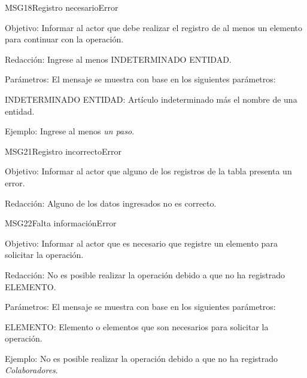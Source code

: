 \begin{mensaje}{MSG18}{Registro necesario}{Error}
    \item[Objetivo:] Informar al actor que debe realizar el registro de al menos un elemento para continuar con la operación.
    \item[Redacción:] Ingrese al menos INDETERMINADO ENTIDAD.
    \item[Parámetros:] El mensaje se muestra con base en los siguientes parámetros:
    \begin{Citemize}
	\item INDETERMINADO ENTIDAD: Artículo indeterminado más el nombre de una entidad.
    \end{Citemize}
    \item[Ejemplo:] Ingrese al menos {\em un paso}.
\end{mensaje}
\begin{mensaje}{MSG21}{Registro incorrecto}{Error}
    \item[Objetivo:] Informar al actor que alguno de los registros de la tabla presenta un error.
    \item[Redacción:] Alguno de los datos ingresados no es correcto.
\end{mensaje}
\begin{mensaje}{MSG22}{Falta información}{Error}
    \item[Objetivo:] Informar al actor que es necesario que registre un elemento para solicitar la operación.
    \item[Redacción:] No es posible realizar la operación debido a que no ha registrado ELEMENTO.
    \item[Parámetros:] El mensaje se muestra con base en los siguientes parámetros:
    \begin{Citemize}
	\item ELEMENTO: Elemento o elementos que son necesarios para solicitar la operación.
    \end{Citemize}
    \item[Ejemplo:] No es posible realizar la operación debido a que no ha registrado { \em Colaboradores}.
\end{mensaje}
